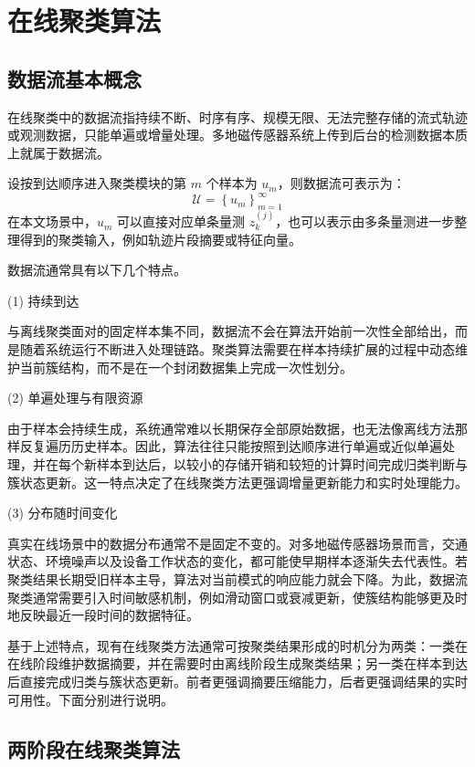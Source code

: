 \documentclass{xdupgthesis}
\begin{document}
\section{在线聚类算法}

\subsection{数据流基本概念}

在线聚类中的数据流指持续不断、时序有序、规模无限、无法完整存储的流式轨迹或观测数据，只能单遍或增量处理。多地磁传感器系统上传到后台的检测数据本质上就属于数据流。

设按到达顺序进入聚类模块的第 $m$ 个样本为 $u_m$，则数据流可表示为：
\begin{equation}
	\mathcal{U}=\left\{u_m\right\}_{m=1}^{\infty}
\end{equation}
在本文场景中，$u_m$ 可以直接对应单条量测 $z_k^{(j)}$，也可以表示由多条量测进一步整理得到的聚类输入，例如轨迹片段摘要或特征向量。

数据流通常具有以下几个特点。

(1) 持续到达

与离线聚类面对的固定样本集不同，数据流不会在算法开始前一次性全部给出，而是随着系统运行不断进入处理链路。聚类算法需要在样本持续扩展的过程中动态维护当前簇结构，而不是在一个封闭数据集上完成一次性划分。

(2) 单遍处理与有限资源

由于样本会持续生成，系统通常难以长期保存全部原始数据，也无法像离线方法那样反复遍历历史样本。因此，算法往往只能按照到达顺序进行单遍或近似单遍处理，并在每个新样本到达后，以较小的存储开销和较短的计算时间完成归类判断与簇状态更新。这一特点决定了在线聚类方法更强调增量更新能力和实时处理能力。

(3) 分布随时间变化


真实在线场景中的数据分布通常不是固定不变的。对多地磁传感器场景而言，交通状态、环境噪声以及设备工作状态的变化，都可能使早期样本逐渐失去代表性。若聚类结果长期受旧样本主导，算法对当前模式的响应能力就会下降。为此，数据流聚类通常需要引入时间敏感机制，例如滑动窗口或衰减更新，使簇结构能够更及时地反映最近一段时间的数据特征。

基于上述特点，现有在线聚类方法通常可按聚类结果形成的时机分为两类：一类在在线阶段维护数据摘要，并在需要时由离线阶段生成聚类结果；另一类在样本到达后直接完成归类与簇状态更新。前者更强调摘要压缩能力，后者更强调结果的实时可用性。下面分别进行说明。

\subsection{两阶段在线聚类算法}
\end{document}
